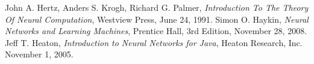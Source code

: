 \documentclass[10pt,a4paper]{article}
\begin{document}
\subtitulo{}


\grupo{}


\maketitle


\newpage


\newpage


\newpage


\newpage


\newpage



\begin{thebibliography}{9}
    John A. Hertz, Anders S. Krogh, Richard G. Palmer,
    \emph{Introduction To The Theory Of Neural Computation},
    Westview Press,
    June 24, 1991.
    Simon O. Haykin,
    \emph{Neural Networks and Learning Machines},
    Prentice Hall,
    3rd Edition,
    November 28, 2008.
    Jeff T. Heaton,
    \emph{Introduction to Neural Networks for Java},
    Heaton Research, Inc.
    November 1, 2005.
\end{thebibliography}
\end{document}
